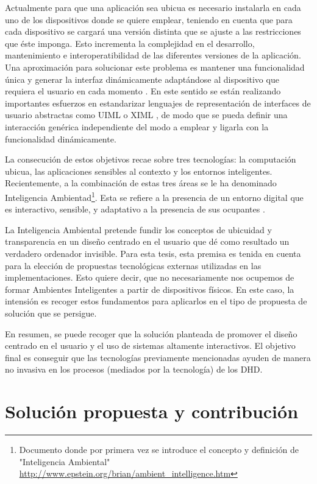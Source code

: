 {\begin{itemize}
Actualmente para que una aplicación sea ubicua
es necesario instalarla en cada uno de los dispositivos donde se quiere emplear,
teniendo en cuenta que para cada dispositivo se cargará una versión distinta que
se ajuste a las restricciones que éste imponga. Esto incrementa la complejidad
en el desarrollo, mantenimiento e interoperatibilidad de las diferentes
versiones de la aplicación. Una aproximación para solucionar este problema es
mantener una funcionalidad única y generar la interfaz dinámicamente adaptándose
al dispositivo que requiera el usuario en cada momento \cite{cap1.205}. En este
sentido se están realizando importantes esfuerzos en estandarizar lenguajes de
representación de interfaces de usuario abstractas como UIML \cite{cap1.16} o
XIML \cite{cap1.214}, de modo que se pueda definir una interacción genérica
independiente del modo a emplear y ligarla con la funcionalidad dinámicamente.
\end{itemize}

La consecución de estos objetivos recae sobre tres tecnologías: la computación
ubicua, las aplicaciones sensibles al contexto y los entornos inteligentes.
Recientemente, a la combinación de estas tres áreas se le ha denominado
Inteligencia 
Ambientad\footnote{
Documento donde por primera vez se introduce el concepto y definición de
"Inteligencia
Ambiental"  \url{http://www.epstein.org/brian/ambient_intelligence.htm}}. Esta
se refiere a la presencia de un entorno digital
que es interactivo, sensible, y adaptativo a la presencia de sus ocupantes
\cite{cap1.16}.

La Inteligencia Ambiental pretende fundir los conceptos de ubicuidad y
transparencia en un diseño centrado en el usuario que dé como resultado un
verdadero ordenador invisible. Para esta tesis, esta premisa es tenida en
cuenta para la elección de propuestas tecnológicas externas utilizadas en las
implementaciones. Esto quiere decir, que no necesariamente nos ocupemos de
formar Ambientes Inteligentes a partir de dispositivos físicos. En este caso,
la intensión es recoger estos fundamentos para aplicarlos en el tipo de
propuesta de solución que se persigue. 

En resumen, se puede recoger que la solución planteada de promover  el diseño
centrado en el usuario y el uso de sistemas altamente interactivos. El objetivo
final es conseguir que las tecnologías previamente mencionadas ayuden de manera
no invasiva en los procesos (mediados por la tecnología) de los DHD.

\section{Solución propuesta y contribución} \label{solucion}

}
